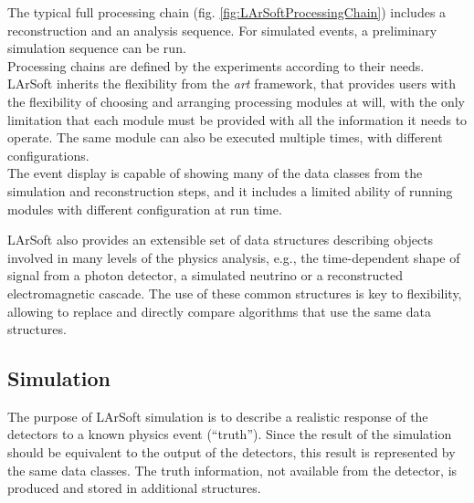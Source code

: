\documentclass{article}
\begin{document}
The typical full processing chain (fig.
\ref{fig:LArSoftProcessingChain}) includes a reconstruction and an
analysis sequence. For simulated events, a preliminary simulation
sequence can be run.\\
Processing chains are defined by the experiments according to their
needs. LArSoft inherits the flexibility from the \emph{art} framework,
that provides users with the flexibility of choosing and arranging
processing modules at will, with the only limitation that each module
must be provided with all the information it needs to operate. The same
module can also be executed multiple times, with different
configurations.\\
The event display is capable of showing many of the data classes from
the simulation and reconstruction steps, and it includes a limited
ability of running modules with different configuration at run time.

LArSoft also provides an extensible set of data structures describing
objects involved in many levels of the physics analysis, e.g., the
time-dependent shape of signal from a photon detector, a simulated
neutrino or a reconstructed electromagnetic cascade. The use of these
common structures is key to flexibility, allowing to replace and
directly compare algorithms that use the same data structures.

\subsection{Simulation}\label{simulation}

The purpose of LArSoft simulation is to describe a realistic response of
the detectors to a known physics event (``truth''). Since the result of
the simulation should be equivalent to the output of the detectors, this
result is represented by the same data classes. The truth information,
not available from the detector, is produced and stored in additional
structures.
\end{document}

